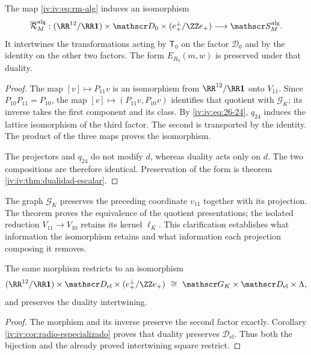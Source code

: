 \begin{theorem}
\label{iv:iv:thm:pantallas-isomorfas}
\label{iv:thm:k-pantallas-coordinadas}
The map \eqref{iv:iv:eq:rm-alg} induces an isomorphism
\[
 \overline{\mathcal R}_M^{\mathrm{alg}}:
 (\RR^{12}/\RR\mathbf1)\times\mathscr D_0
 \times(e_+^\perp/\ZZ e_+)
 \longrightarrow\mathscr S_M^{\mathrm{alg}}.
\]
It intertwines the transformations acting by \(\mathsf T_0\)
on the factor \(\mathscr D_0\) and by the identity on the
other two factors. The form \(E_{R_0}(m,w)\) is preserved
under that duality.
\end{theorem}
\begin{proof}
The map \([v]\mapsto P_{11}v\) is an isomorphism
from \(\RR^{12}/\RR\mathbf1\) onto \(V_{11}\).
Since \(P_{10}P_{11}=P_{10}\), the map
\([v]\mapsto(P_{11}v,P_{10}v)\) identifies that quotient
with \(\mathscr G_K\); its inverse takes the first component
and its class. By \eqref{iv:iv:eq:26-24}, \(q_{24}\) induces the
lattice isomorphism of the third factor. The second is
transported by the identity. The product of the three
maps proves the isomorphism.

The projectors and \(q_{24}\) do not modify \(d\), whereas
duality acts only on \(d\). The two
compositions are therefore identical. Preservation of the form
is theorem \ref{iv:iv:thm:dualidad-escalar}.
\end{proof}

The graph \(\mathscr G_K\) preserves the preceding coordinate
\(v_{11}\) together with its projection. The theorem proves
the equivalence of the quotient presentations; the isolated
reduction \(V_{11}\to V_{10}\) retains its kernel
\(\ell_K\). This clarification establishes what information
the isomorphism retains and what information each
projection composing it removes.

\begin{corollary}
The same morphism restricts to an isomorphism
\[
 (\RR^{12}/\RR\mathbf1)\times\mathscr D_{\mathrm{el}}
 \times(e_+^\perp/\ZZ e_+)
 \ \cong\ \mathscr G_K\times\mathscr D_{\mathrm{el}}\times\Lambda,
\]
and preserves the duality intertwining.
\end{corollary}
\begin{proof}
The morphism and its inverse preserve the second factor exactly.
Corollary \ref{iv:iv:cor:radio-especializado} proves that duality
preserves \(\mathscr D_{\mathrm{el}}\). Thus both the bijection and
the already proved intertwining square restrict.
\end{proof}

